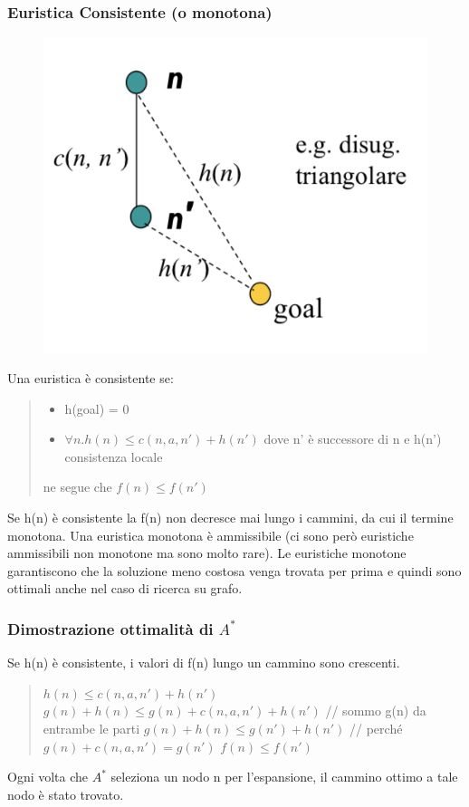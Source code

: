 \documentclass{article}
\begin{document}
\subsubsection{Euristica Consistente (o monotona)}
\begin{figure}[H]
    \centering
    \includegraphics[scale=0.5]{Images/eurconsist.png}
\end{figure}
Una euristica è consistente se:
\begin{quote}
    \begin{itemize}
    \item h(goal) = 0
    \item $\forall n . h(n) \leq c(n,a,n')+h(n')$ dove n' è successore di n e h(n') consistenza locale
    \end{itemize}
    ne segue che $f(n) \leq f(n')$
\end{quote}
Se h(n) è consistente la f(n) non decresce mai lungo i cammini, da cui il termine monotona. \newline
Una euristica monotona è ammissibile (ci sono però euristiche ammissibili non monotone ma sono molto rare). Le euristiche monotone garantiscono che la soluzione meno costosa venga trovata per prima e quindi sono ottimali anche nel caso di ricerca su grafo.

\subsubsection{Dimostrazione ottimalità di $A^*$}
Se h(n) è consistente, i valori di f(n) lungo un cammino sono crescenti.
\begin{quote}
    $h(n) \leq c(n,a,n')+h(n')$ \newline
    $g(n) + h(n) \leq g(n) + c(n,a,n')+h(n')$ // sommo g(n) da entrambe le parti\newline
    $g(n) + h(n) \leq g(n')+h(n')$ // perché $g(n) + c(n,a,n') = g(n')$ \newline
    $f(n) \leq f(n')$
\end{quote}
Ogni volta che $A^*$ seleziona un nodo n per l'espansione, il cammino ottimo a tale nodo è stato trovato.
\end{document}
